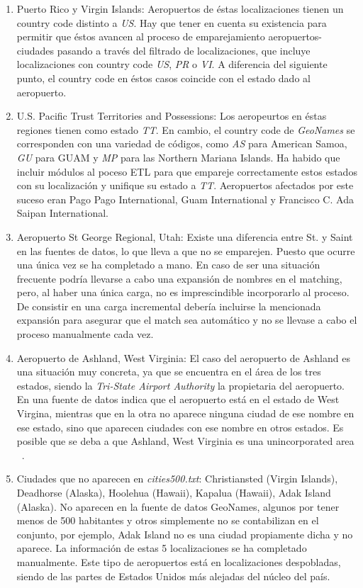 \documentclass{article}
\begin{document}
\begin{enumerate}
    \item Puerto Rico y Virgin Islands: Aeropuertos de éstas localizaciones tienen un country code distinto a \textit{US}. Hay que tener en cuenta su existencia para permitir que éstos avancen al proceso de emparejamiento aeropuertos-ciudades pasando a través del filtrado de localizaciones, que incluye localizaciones con country code \textit{US}, \textit{PR} o \textit{VI}. A diferencia del siguiente punto, el country code en éstos casos coincide con el estado dado al aeropuerto.
    \item U.S. Pacific Trust Territories and Possessions: Los aeropeurtos en éstas regiones tienen como estado \textit{TT}. En cambio, el country code de \textit{GeoNames} se corresponden con una variedad de códigos, como \textit{AS} para American Samoa, \textit{GU} para GUAM y \textit{MP} para las Northern Mariana Islands. Ha habido que incluir módulos al poceso ETL para que empareje correctamente estos estados con su localización y unifique su estado a \textit{TT}. Aeropuertos afectados por este suceso eran Pago Pago International, Guam International y Francisco C. Ada Saipan International.
    \item Aeropuerto St George Regional, Utah: Existe una diferencia entre St. y Saint en las fuentes de datos, lo que lleva a que no se emparejen. Puesto que ocurre una única vez se ha completado a mano. En caso de ser una situación frecuente podría llevarse a cabo una expansión de nombres en el matching, pero, al haber una única carga, no es imprescindible incorporarlo al proceso. De consistir en una carga incremental debería incluirse la mencionada expansión para asegurar que el match sea automático y no se llevase a cabo el proceso manualmente cada vez.
    \item Aeropuerto de Ashland, West Virginia: El caso del aeropuerto de Ashland es una situación muy concreta, ya que se encuentra en el área de los tres estados, siendo la \textit{Tri-State Airport Authority} la propietaria del aeropuerto. En una fuente de datos indica que el aeropuerto está en el estado de West Virgina, mientras que en la otra no aparece ninguna ciudad de ese nombre en ese estado, sino que aparecen ciudades con ese nombre en otros estados. Es posible que se deba a que Ashland, West Virginia es una unincorporated area ~\cite{UA}.
    \item Ciudades que no aparecen en \textit{cities500.txt}: Christiansted (Virgin Islands), Deadhorse (Alaska), Hoolehua (Hawaii), Kapalua (Hawaii), Adak Island (Alaska). No aparecen en la fuente de datos GeoNames, algunos por tener menos de 500 habitantes y otros simplemente no se contabilizan en el conjunto, por ejemplo, Adak Island no es una ciudad propiamente dicha y no aparece. La información de estas 5 localizaciones se ha completado manualmente. Este tipo de aeropuertos está en localizaciones despobladas, siendo de las partes de Estados Unidos más alejadas del núcleo del país.
\end{enumerate}
\end{document}
